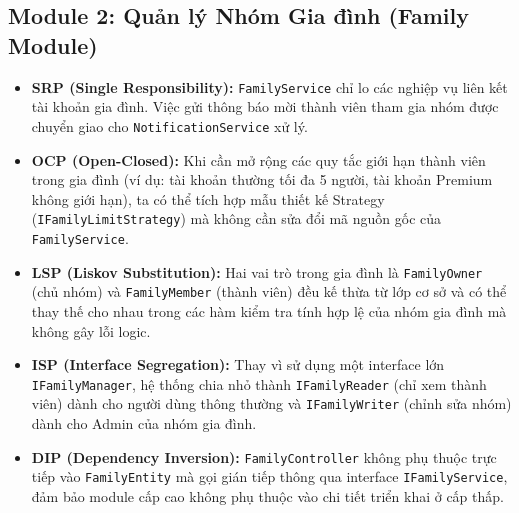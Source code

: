\documentclass[12pt,a4paper]{article}
\begin{document}
\subsection{Module 2: Quản lý Nhóm Gia đình (Family Module)}
\begin{itemize}
    \item \textbf{SRP (Single Responsibility):} \texttt{FamilyService} chỉ lo các nghiệp vụ liên kết tài khoản gia đình. Việc gửi thông báo mời thành viên tham gia nhóm được chuyển giao cho \texttt{NotificationService} xử lý.
    \item \textbf{OCP (Open-Closed):} Khi cần mở rộng các quy tắc giới hạn thành viên trong gia đình (ví dụ: tài khoản thường tối đa 5 người, tài khoản Premium không giới hạn), ta có thể tích hợp mẫu thiết kế Strategy (\texttt{IFamilyLimitStrategy}) mà không cần sửa đổi mã nguồn gốc của \texttt{FamilyService}.
    \item \textbf{LSP (Liskov Substitution):} Hai vai trò trong gia đình là \texttt{FamilyOwner} (chủ nhóm) và \texttt{FamilyMember} (thành viên) đều kế thừa từ lớp cơ sở và có thể thay thế cho nhau trong các hàm kiểm tra tính hợp lệ của nhóm gia đình mà không gây lỗi logic.
    \item \textbf{ISP (Interface Segregation):} Thay vì sử dụng một interface lớn \texttt{IFamilyManager}, hệ thống chia nhỏ thành \texttt{IFamilyReader} (chỉ xem thành viên) dành cho người dùng thông thường và \texttt{IFamilyWriter} (chỉnh sửa nhóm) dành cho Admin của nhóm gia đình.
    \item \textbf{DIP (Dependency Inversion):} \texttt{FamilyController} không phụ thuộc trực tiếp vào \texttt{FamilyEntity} mà gọi gián tiếp thông qua interface \texttt{IFamilyService}, đảm bảo module cấp cao không phụ thuộc vào chi tiết triển khai ở cấp thấp.
\end{itemize}
\end{document}

